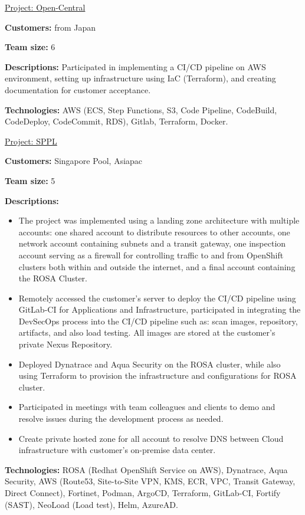 \documentclass[letterpaper,10pt]{article}
\newenvironment{resume_list}{
  \vspace{-7pt}
  \begin{itemize}[itemsep=-2px, parsep=1pt, leftmargin=30pt]
}{
  \end{itemize}
}
\newcommand{\itemTitle}[1]{
  \item[] \underline{#1}\vspace{4pt}
}
\begin{document}
\begin{resume_list}
    \itemTitle{Project: Open-Central}
    \item \textbf{Customers:} from Japan
    \item \textbf{Team size:} 6
    \item \textbf{Descriptions:} Participated in implementing a CI/CD pipeline on AWS environment, setting up infrastructure using IaC (Terraform), and creating documentation for customer acceptance.
    \item \textbf{Technologies:} AWS (ECS, Step Functions, S3, Code Pipeline, CodeBuild, CodeDeploy, CodeCommit, RDS), Gitlab, Terraform, Docker.
\end{resume_list}

\begin{resume_list}
    \itemTitle{Project: SPPL}
    \item \textbf{Customers:} Singapore Pool, Asiapac
    \item \textbf{Team size:} 5
    \item \textbf{Descriptions:}
    \begin{itemize}
        \item The project was implemented using a landing zone architecture with multiple accounts: one shared account to distribute resources to other accounts, one network account containing subnets and a transit gateway, one inspection account serving as a firewall for controlling traffic to and from OpenShift clusters both within and outside the internet, and a final account containing the ROSA Cluster.
        \item Remotely accessed the customer's server to deploy the CI/CD pipeline using GitLab-CI for Applications and Infrastructure, participated in integrating the DevSecOps process into the CI/CD pipeline such as: scan images, repository, artifacts, and also load testing. All images are stored at the customer's private Nexus Repository.
        \item Deployed Dynatrace and Aqua Security on the ROSA cluster, while also using Terraform to provision the infrastructure and configurations for ROSA cluster.
        \item Participated in meetings with team colleagues and clients to demo and resolve issues during the development process as needed.
        \item Create private hosted zone for all account to resolve DNS between Cloud infrastructure with customer's on-premise data center.
    \end{itemize}
    \item \textbf{Technologies:} ROSA (Redhat OpenShift Service on AWS), Dynatrace, Aqua Security, AWS (Route53, Site-to-Site VPN, KMS, ECR, VPC, Transit Gateway, Direct Connect), Fortinet, Podman, ArgoCD, Terraform, GitLab-CI, Fortify (SAST), NeoLoad (Load test), Helm, AzureAD.
\end{resume_list}
\end{document}
